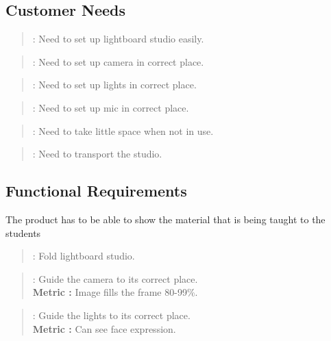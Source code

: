 \documentclass[a4paper]{jpconf}
\begin{document}
	\subsection{Customer Needs}\label{CN}
	
	\begin{quote}
		\textbf{} : Need to set up lightboard studio easily.
	\end{quote}
	
	\begin{quote}
		\textbf{} : Need to set up camera in correct place.
	\end{quote}
	
	\begin{quote} 
		\textbf{} : Need to set up lights in correct place.
	\end{quote}
	
	\begin{quote} 
		\textbf{} :  Need to set up mic in correct place.
	\end{quote}
	
	\begin{quote} 
		\textbf{}:  Need to take little space when not in use.
	\end{quote}
	
	\begin{quote} 
		\textbf{} :  Need to transport the studio.
	\end{quote}
	
	\subsection{Functional Requirements} \label{FR}
	The product has to be able to show the material that is being taught to the students
	\begin{quote} 
		\textbf{} : Fold lightboard studio.
	\end{quote}
	
	\begin{quote} 
		\textbf{} :  Guide  the camera to its correct place.
		\\ \textbf{Metric :} Image fills the frame 80-99\%.
	\end{quote}
	
	\begin{quote} 
		\textbf{} :  Guide the lights  to its correct place.
		\\ \textbf{Metric :} Can see face expression.
	\end{quote}
	
\end{document}

